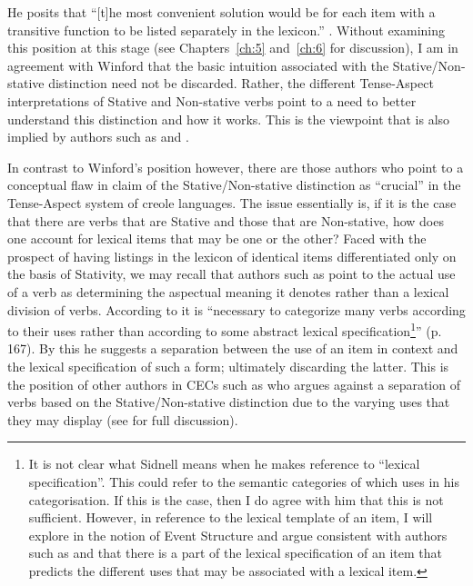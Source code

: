 He posits that “[t]he most convenient solution would be for each item
with a transitive function to be listed separately in the lexicon.”
\citep[196]{Winford1993}.  Without examining this position at this stage (see Chapters~\ref{ch:5} and~\ref{ch:6}
for discussion), I am in agreement with Winford that the
basic intuition associated with the Stative\slash Non-stative distinction
need not be discarded.  Rather, the different Tense-Aspect
interpretations of Stative and Non-stative verbs point to a need to
better understand this distinction and how it works.  This is the
viewpoint that is also implied by authors such as \citet{Andersen1990}
and \citet{Gooden2008}.

In contrast to Winford’s position however, there are those authors who
point to a conceptual flaw in  claim of the
Stative\slash Non-stative distinction as ``crucial'' in the Tense-Aspect
system of creole languages.  The issue essentially is, if it is the
case that there are verbs that are Stative and those that are
Non-stative, how does one account for lexical items that may be one or
the other?  Faced with the prospect of having listings in the lexicon
of identical items differentiated only on the basis of Stativity, we
may recall that authors such as \citet{Sidnell2002} point to the
actual use of a verb as determining the aspectual meaning it denotes
rather than a lexical division of verbs.  According to
\citet[167]{Sidnell2002} it is “necessary to categorize many verbs
according to their uses rather than according to some abstract lexical
specification\footnote{It is not clear what Sidnell means when he
  makes reference to ``lexical specification''. This could refer to the
  semantic categories of \citet{Dixon1977} which \citet{Winford1993}
  uses in his categorisation. If this is the case, then I do agree
  with him that this is not sufficient. However, in reference to the
  lexical template of an item, I will explore in  the
  notion of Event Structure and argue consistent with authors such as
  \citet{Pustejovsky1991} and \citet{Levin1993} that there is a part
  of the lexical specification of an item that predicts the different
  uses that may be associated with a lexical item.}” (p. 167).  By
this he suggests a separation between the use of an item in context
and the lexical specification of such a form; ultimately discarding
the latter.  This is the position of other authors in CECs such as
\citet{Jaganauth1987} who argues against a separation of verbs based
on the Stative\slash Non-stative distinction due to the varying uses that
they may display (see  for full
discussion).

